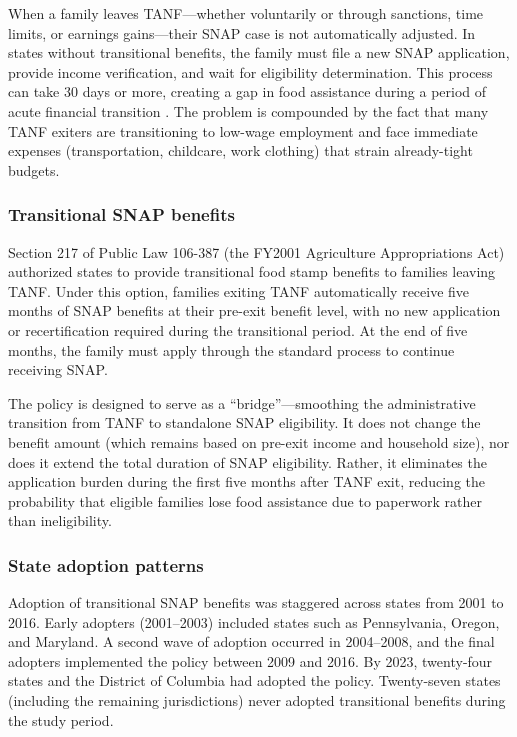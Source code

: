 \documentclass[12pt]{article}
\begin{document}
When a family leaves TANF---whether voluntarily or through sanctions, time limits, or earnings gains---their SNAP case is not automatically adjusted. In states without transitional benefits, the family must file a new SNAP application, provide income verification, and wait for eligibility determination. This process can take 30 days or more, creating a gap in food assistance during a period of acute financial transition \citep{ziliak2015temporary}. The problem is compounded by the fact that many TANF exiters are transitioning to low-wage employment and face immediate expenses (transportation, childcare, work clothing) that strain already-tight budgets.

\subsubsection*{Transitional SNAP benefits} Section 217 of Public Law 106-387 (the FY2001 Agriculture Appropriations Act) authorized states to provide transitional food stamp benefits to families leaving TANF. Under this option, families exiting TANF automatically receive five months of SNAP benefits at their pre-exit benefit level, with no new application or recertification required during the transitional period. At the end of five months, the family must apply through the standard process to continue receiving SNAP.

The policy is designed to serve as a ``bridge''---smoothing the administrative transition from TANF to standalone SNAP eligibility. It does not change the benefit amount (which remains based on pre-exit income and household size), nor does it extend the total duration of SNAP eligibility. Rather, it eliminates the application burden during the first five months after TANF exit, reducing the probability that eligible families lose food assistance due to paperwork rather than ineligibility.

\subsubsection*{State adoption patterns} Adoption of transitional SNAP benefits was staggered across states from 2001 to 2016. Early adopters (2001--2003) included states such as Pennsylvania, Oregon, and Maryland. A second wave of adoption occurred in 2004--2008, and the final adopters implemented the policy between 2009 and 2016. By 2023, twenty-four states and the District of Columbia had adopted the policy. Twenty-seven states (including the remaining jurisdictions) never adopted transitional benefits during the study period.
\end{document}
